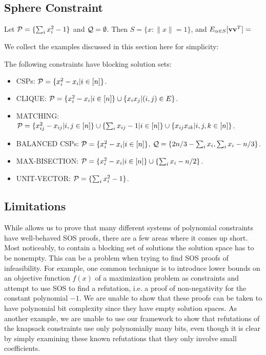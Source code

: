 \subsection{Sphere Constraint}
Let $\mathcal P = \{\sum_i x_i^2 - 1\}$ and $\mathcal Q = \emptyset$. Then $S = \{x: \|x\| = 1\}$, and $E_{\alpha \in S}[{\bf v}{\bf v}^T] = $

We collect the examples discussed in this section here for simplicity:
\begin{theorem}\label{thm:examples}
The following constraints have blocking solution sets:
\begin{itemize}
\item CSPs: $\mathcal P = \{x_i^2 - x_i | i \in [n]\}$. 
\item CLIQUE: $\mathcal P = \{x_i^2 - x_i | i \in [n]\} \cup \{x_ix_j | (i,j) \in E\}$.
\item MATCHING: $\mathcal P = \{x_{ij}^2 - x_{ij} | i,j \in [n]\} \cup \{\sum_i x_{ij} - 1 | i \in [n]\} \cup \{x_{ij}x_{ik} | i,j,k \in [n]\}$.
\item BALANCED CSPs: $\mathcal P = \{x_i^2 - x_i | i \in [n]\}$, $\mathcal Q = \{2n/3 - \sum_i x_i, \sum_i x_i - n/3\}$.
\item MAX-BISECTION: $\mathcal P = \{x_i^2 - x_i | i \in [n]\} \cup \{\sum_i x_i - n/2\}$.
\item UNIT-VECTOR: $\mathcal P = \{\sum_i x_i^2 - 1\}$.
\end{itemize}
\end{theorem}

\subsection{Limitations}
While  allows us to prove that many different systems of polynomial constraints have well-behaved SOS proofs, there are a few areas where it comes up short. Most noticeably, to contain a blocking set of solutions the solution space has to be nonempty. This can be a problem when trying to find SOS proofs of infeasibility. For example, one common technique is to introduce lower bounds on an objective function $f(x)$ of a maximization problem as constraints and attempt to use SOS to find a refutation, i.e. a proof of non-negativity for the constant polynomial $-1$. We are unable to show that these proofs can be taken to have polynomial bit complexity since they have empty solution spaces. As another example, we are unable to use our framework to show that refutations of the knapsack constraints use only polynomially many bits, even though it is clear by simply examining these known refutations that they only involve small coefficients. 
